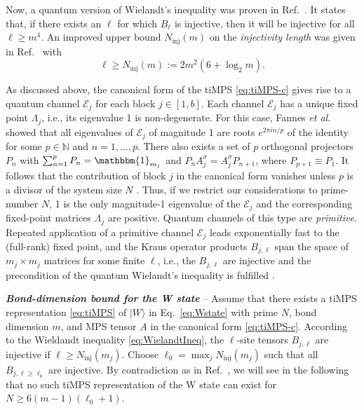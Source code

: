 \documentclass[english,11pt,aps,pra,onecolumn,tightenlines,groupedaddress,superscriptaddress,notitlepage,floatfix,fleqn]{revtex4-1}
\newcommand{\id}{\mathbbm{1}}
\newcommand{\ket}{\rangle}
\newcommand{\s}{\sigma}
\newcommand{\NN}{\mathbb{N}}
\newcommand{\mc}[1]{\mathcal{#1}}
\newcommand{\E}{\mc{E}}
\newcommand{\inj}{\text{inj}}
\newcommand{\Emph}[1]{\textbf{\emph{#1}}}
\begin{document}
Now, a quantum version of Wielandt's inequality was proven in Ref.~\cite{Sanz2010-56}. It states that, if there exists an $\ell$ for which $B_\ell$ is injective, then it will be injective for all $\ell \geq m^4$. An improved upper bound $N_\inj(m)$ on the \emph{injectivity length} was given in Ref.~\cite{Michalek2019-65} with
\begin{equation}\label{eq:WielandtIneq}
	\ell\geq N_\inj(m):= 2 m^2(6+\log_2 m).
\end{equation}

As discussed above, the canonical form of the tiMPS \eqref{eq:tiMPS-c} gives rise to a quantum channel $\E_j$ for each block $j\in[1,b]$. Each channel $\E_j$ has a unique fixed point $\Lambda_j$, i.e., its eigenvalue 1 is non-degenerate. For this case, Fannes \emph{et al.} \cite{Fannes1992-144} showed that all eigenvalues of $\E_j$ of magnitude 1 are roots $e^{2\pi i n/p}$ of the identity for some $p\in\NN$ and $n=1,\dotsc,p$. There also exists a set of $p$ orthogonal projectors $P_n$ with $\sum_{n=1}^p P_n=\id_{m_j}$ and $P_n A_j^\s =A_j^\s P_{n+1}$, where $P_{p+1}\equiv P_1$. It follows that the contribution of block $j$ in the canonical form vanishes unless $p$ is a divisor of the system size $N$ \cite{PerezGarcia2007-7}. Thus, if we restrict our considerations to prime-number $N$, 1 is the only magnitude-1 eigenvalue of the $\E_j$ and the corresponding fixed-point matrices $\Lambda_j$ are positive. Quantum channels of this type are \emph{primitive}. Repeated application of a primitive channel $\E_j$ leads exponentially fast to the (full-rank) fixed point, and the Kraus operator products $B_{j,\ell}$ span the space of $m_j\times m_j$ matrices for some finite $\ell$, i.e., the $B_{j,\ell}$ are injective and the precondition of the quantum Wielandt's inequality is fulfilled \cite{Sanz2010-56}.

\Emph{Bond-dimension bound for the W state} -- Assume that there exists a tiMPS representation \eqref{eq:tiMPS} of $|W\ket$ in Eq.~\eqref{eq:Wstate} with prime $N$, bond dimension $m$, and MPS tensor $A$ in the canonical form \eqref{eq:tiMPS-c}. According to the Wieldandt inequality \eqref{eq:WielandtIneq}, the $\ell$-site tensors $B_{j,\ell}$ are injective if $\ell\geq N_\inj(m_j)$. Choose $\ell_0=\max_j N_\inj(m_j)$ such that all $B_{j,\ell\geq\ell_0}$ are injective. By contradiction as in Ref.~\cite{PerezGarcia2007-7}, we will see in the following that no such tiMPS representation of the W state can exist for $N\geq 6(m-1)(\ell_0+1)$.
\end{document}
